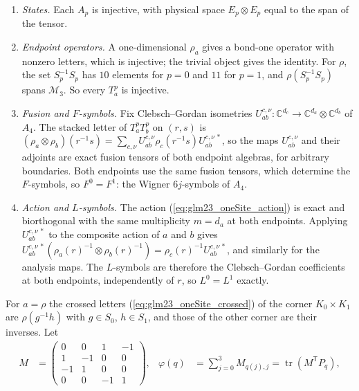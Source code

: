 \documentclass{article}
\begin{document}
\begin{enumerate}
    \item \emph{States.} Each $A_p$ is injective, with physical space
          $E_p\otimes E_p$ equal to the span of the tensor.
    \item \emph{Endpoint operators.} A one-dimensional $\rho_a$ gives a
          bond-one operator with nonzero letters, which is injective; the
          trivial object gives the identity. For $\rho$, the set
          $S_p^{-1}S_p$ has $10$ elements for $p=0$ and $11$ for $p=1$,
          and $\rho(S_p^{-1}S_p)$ spans $\mathcal M_3$. So every $T^p_a$ is
          injective.
    \item \emph{Fusion and $F$-symbols.} Fix Clebsch--Gordan isometries
          $U^{c,\nu}_{ab}:\mathbb C^{d_c}\to\mathbb C^{d_a}\otimes\mathbb C^{d_b}$
          of $A_4$. The stacked letter of $T^p_aT^p_b$ on $(r,s)$ is
          $(\rho_a\otimes\rho_b)(r^{-1}s)
              =\sum_{c,\nu}U^{c,\nu}_{ab}\rho_c(r^{-1}s)U^{c,\nu\,*}_{ab}$,
          so the maps $U^{c,\nu}_{ab}$ and their adjoints are exact fusion
          tensors of both endpoint algebras, for arbitrary boundaries. Both
          endpoints use the same fusion tensors, which determine the
          $F$-symbols, so $F^0=F^1$: the Wigner $6j$-symbols of $A_4$.
    \item \emph{Action and $L$-symbols.} The action
          (\ref{eq:glm23_oneSite_action}) is exact and biorthogonal with the
          same multiplicity $m=d_a$ at both endpoints. Applying
          $U^{c,\nu\,*}_{ab}$ to the composite action of $a$ and $b$ gives
          $U^{c,\nu\,*}_{ab}(\rho_a(r)^{-1}\otimes\rho_b(r)^{-1})
              =\rho_c(r)^{-1}U^{c,\nu\,*}_{ab}$, and similarly for the analysis
          maps. The $L$-symbols are therefore the Clebsch--Gordan
          coefficients at both endpoints, independently of $r$, so
          $L^0=L^1$ exactly.
\end{enumerate}
For $a=\rho$ the crossed letters (\ref{eq:glm23_oneSite_crossed}) of the
corner $K_0\times K_1$ are $\rho(g^{-1}h)$ with $g\in S_0$, $h\in S_1$,
and those of the other corner are their inverses. Let
\begin{align}
    M          & =\begin{pmatrix}
                      0  & 0  & 1  & -1 \\
                      1  & -1 & 0  & 0  \\
                      -1 & 1  & 0  & 0  \\
                      0  & 0  & -1 & 1
                  \end{pmatrix},
               &
    \varphi(q) & =\sum_{j=0}^{3}M_{q(j),j}=\operatorname{tr}(M^{\mathsf T}P_q),
    \label{eq:glm23_oneSite_coefficient}
\end{align}
\end{document}

